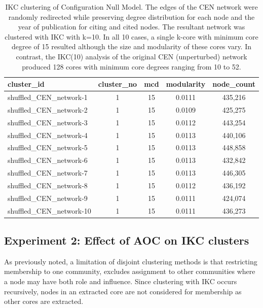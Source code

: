 \documentclass[12pt, oneside]{article}   	%
\begin{document}
\begin{table}[ht]
\centering
\captionsetup{width=0.9\textwidth}
\caption{IKC clustering of Configuration Null Model. The edges of the CEN network were randomly redirected while preserving degree distribution for each node and the year of publication for citing and cited nodes. 
The resultant network was clustered with IKC with k=10.  In all 10 cases, a single k-core with minimum core degree of 15 resulted although the size and modularity of these cores vary. In contrast, the IKC(10) analysis of the original CEN (unperturbed) network produced 128 cores  with minimum core degrees ranging from 10 to 52.}
\begin{tabular}{lcccc}
  \hline
cluster\_id & cluster\_no & mcd & modularity & node\_count  \\ 
  \hline
shuffled\_CEN\_network-1 &     1 &    15 & 0.0111 & 435,216 \\
shuffled\_CEN\_network-2 &     1 &    15 & 0.0109 & 425,275 \\
shuffled\_CEN\_network-3 &     1 &    15 & 0.0112 & 443,254 \\
shuffled\_CEN\_network-4 &     1 &    15 & 0.0113 & 440,106 \\
shuffled\_CEN\_network-5 &     1 &    15 & 0.0113 & 448,858 \\
shuffled\_CEN\_network-6 &     1 &    15 & 0.0113 & 432,842 \\
shuffled\_CEN\_network-7 &     1 &    15 & 0.0113 & 446,305 \\
shuffled\_CEN\_network-8 &     1 &    15 & 0.0112 & 436,192 \\
shuffled\_CEN\_network-9 &     1 &    15 & 0.0111 & 424,074 \\
shuffled\_CEN\_network-10 &    1 &   15 & 0.0111 & 436,273 \\ 
   \hline
\end{tabular}
\label{tab:tab1}
\end{table}


\subsection{Experiment 2: Effect of AOC on IKC clusters} 
As previously noted, a limitation of disjoint clustering methods is that restricting membership to one community, excludes assignment to other communities where a node may have both role and influence. Since clustering with IKC occurs recursively, nodes in an extracted core are not considered for membership as other cores are extracted. 
\end{document}
